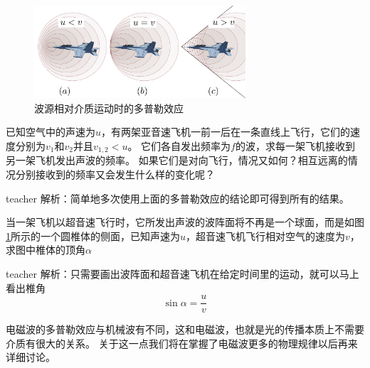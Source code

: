 \begin{enumerate}
\begin{figure}[hbtp]
\centering
\includegraphics[width=0.7\textwidth]{images/ow-3.pdf}
\caption{波源相对介质运动时的多普勒效应}\label{fig: ow-波源相对介质运动时的多普勒效应}
\end{figure}

\end{enumerate}

\begin{example}
已知空气中的声速为$u$，有两架亚音速飞机一前一后在一条直线上飞行，它们的速度分别为$v_1$和$v_2$并且$v_{1,2}<u$。
它们各自发出频率为$f$的波，求每一架飞机接收到另一架飞机发出声波的频率。
如果它们是对向飞行，情况又如何？相互远离的情况分别接收到的频率又会发生什么样的变化呢？
\begin{taggedblock}{teacher}
\newline
解析：简单地多次使用上面的多普勒效应的结论即可得到所有的结果。
\end{taggedblock}
\end{example}

\begin{example}
当一架飞机以超音速飞行时，它所发出声波的波阵面将不再是一个球面，而是如图\ref{fig: ow-波源相对介质运动时的多普勒效应}所示的一个圆椎体的侧面，已知声速为$u$，超音速飞机飞行相对空气的速度为$v$，求图中椎体的顶角$\alpha$
\begin{taggedblock}{teacher}
\newline
解析：只需要画出波阵面和超音速飞机在给定时间里的运动，就可以马上看出椎角
\[  \sin\alpha  = \frac{u}{v}\]
\end{taggedblock}
\end{example}

电磁波的多普勒效应与机械波有不同，这和电磁波，也就是光的传播本质上不需要介质有很大的关系。
关于这一点我们将在掌握了电磁波更多的物理规律以后再来详细讨论。




